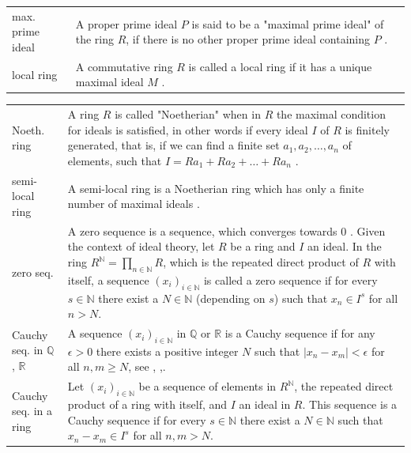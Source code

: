 \documentclass[12pt]{amsart}
\theoremstyle{definition}
\begin{document}
{\begin{table}[H]
\begin{tabular}{|P{1.4cm} p{13.4cm}|}
		\\
		max. prime ideal & A proper prime ideal $P$ is said to be a "maximal prime ideal" of the ring $R$, if there is no other proper prime ideal containing $P$ \cite[p.~23]{Ref_Northcott_1953}.
		\\
		local ring & A commutative ring $R$ is called a local ring if it has a unique maximal ideal $M$ \cite[p.~522]{Ref_Rotman_2005}.
		\\ \hline
	\end{tabular}
\end{table}}

{\renewcommand{\arraystretch}{1.8}
\begin{table}[H]
	\centering
	\begin{tabular}{|P{1.4cm} p{13.4cm}|}
		\hline
		Noeth. ring & A ring $R$ is called "Noetherian" when in $R$ the maximal condition for ideals is satisfied, in other words if every ideal $I$ of $R$ is finitely generated, that is, if we can find a finite set $a_1,a_2,\ldots,a_n$ of elements, such that $I=Ra_1+Ra_2+\ldots+Ra_n$ \cite[p.~19, 101]{Ref_Northcott_1953}.
		\\
		semi-local ring & A semi-local ring is a Noetherian ring which has only a finite number of maximal ideals \cite[p.~107]{Ref_Northcott_1953}.
		\\
		zero seq. & A zero sequence is a sequence, which converges towards $0$ \cite[p.~154]{Ref_Schmidt_2007}. Given the context of ideal theory, let $R$ be a ring and $I$ an ideal. In the ring $R^\mathbb{N}=\prod_{n\in\mathbb{N}}R$, which is the repeated direct product of $R$ with itself, a sequence $(x_i)_{i\in\mathbb{N}}$ is called a zero sequence if for every $s\in\mathbb{N}$ there exist a $N\in\mathbb{N}$ (depending on $s$) such that $x_n\in I^s$ for all $n>N$.
		\\
		Cauchy seq. in $\mathbb{Q}$, $\mathbb{R}$ & A sequence $(x_i)_{i\in\mathbb{N}}$ in $\mathbb{Q}$ or $\mathbb{R}$ is a Cauchy sequence if for any $\epsilon>0$ there exists a positive integer $N$ such that $|x_n-x_m|<\epsilon$ for all $n,m\ge N$, see \cite[p.~153]{Ref_Schmidt_2007}, \cite[p.~24]{Ref_Higham_2015},\cite[p.~10]{Ref_Koblitz_1984}.
		\\
		Cauchy seq. in a ring & Let $(x_i)_{i\in\mathbb{N}}$ be a sequence of elements in $R^\mathbb{N}$, the repeated direct product of a ring with itself, and $I$ an ideal in $R$. This sequence is a Cauchy sequence if for every $s\in\mathbb{N}$ there exist a $N\in\mathbb{N}$ such that $x_n-x_m\in I^s$ for all $n,m>N$.
		\\

\end{tabular}
\end{table}}
\end{document}
